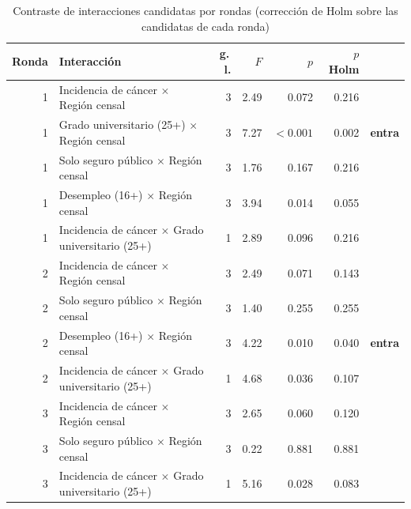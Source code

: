 \begin{table}[htbp]
\centering
\footnotesize
\caption{Contraste de interacciones candidatas por rondas (corrección de Holm sobre las candidatas de cada ronda)}\label{tab:interacciones}
\begin{tabularx}{\linewidth}{r >{\raggedright\arraybackslash}X r r r r l}
\toprule
Ronda & Interacción & g.\,l. & $F$ & $p$ & $p$ Holm &  \\
\midrule
1 & Incidencia de cáncer $\times$ Región censal & 3 & \num{2.49} & \num{0.072} & \num{0.216} &  \\
1 & Grado universitario (25+) $\times$ Región censal & 3 & \num{7.27} & $<\num{0.001}$ & \num{0.002} & \textbf{entra} \\
1 & Solo seguro público $\times$ Región censal & 3 & \num{1.76} & \num{0.167} & \num{0.216} &  \\
1 & Desempleo (16+) $\times$ Región censal & 3 & \num{3.94} & \num{0.014} & \num{0.055} &  \\
1 & Incidencia de cáncer $\times$ Grado universitario (25+) & 1 & \num{2.89} & \num{0.096} & \num{0.216} &  \\
2 & Incidencia de cáncer $\times$ Región censal & 3 & \num{2.49} & \num{0.071} & \num{0.143} &  \\
2 & Solo seguro público $\times$ Región censal & 3 & \num{1.40} & \num{0.255} & \num{0.255} &  \\
2 & Desempleo (16+) $\times$ Región censal & 3 & \num{4.22} & \num{0.010} & \num{0.040} & \textbf{entra} \\
2 & Incidencia de cáncer $\times$ Grado universitario (25+) & 1 & \num{4.68} & \num{0.036} & \num{0.107} &  \\
3 & Incidencia de cáncer $\times$ Región censal & 3 & \num{2.65} & \num{0.060} & \num{0.120} &  \\
3 & Solo seguro público $\times$ Región censal & 3 & \num{0.22} & \num{0.881} & \num{0.881} &  \\
3 & Incidencia de cáncer $\times$ Grado universitario (25+) & 1 & \num{5.16} & \num{0.028} & \num{0.083} &  \\
\bottomrule
\end{tabularx}

\end{table}
